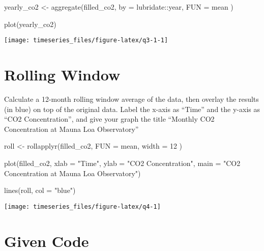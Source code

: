 \documentclass[
]{book}
\newenvironment{Shaded}{\begin{snugshade}}{\end{snugshade}}
\newcommand{\AttributeTok}[1]{\textcolor[rgb]{0.77,0.63,0.00}{#1}}
\newcommand{\DecValTok}[1]{\textcolor[rgb]{0.00,0.00,0.81}{#1}}
\newcommand{\FunctionTok}[1]{\textcolor[rgb]{0.00,0.00,0.00}{#1}}
\newcommand{\NormalTok}[1]{#1}
\newcommand{\OtherTok}[1]{\textcolor[rgb]{0.56,0.35,0.01}{#1}}
\newcommand{\SpecialCharTok}[1]{\textcolor[rgb]{0.00,0.00,0.00}{#1}}
\newcommand{\StringTok}[1]{\textcolor[rgb]{0.31,0.60,0.02}{#1}}
\begin{document}
\begin{Shaded}
\begin{Highlighting}[]
\NormalTok{yearly\_co2 }\OtherTok{\textless{}{-}} \FunctionTok{aggregate}\NormalTok{(filled\_co2,}
  \AttributeTok{by =}\NormalTok{ lubridate}\SpecialCharTok{::}\NormalTok{year,}
  \AttributeTok{FUN =}\NormalTok{ mean}
\NormalTok{)}


\FunctionTok{plot}\NormalTok{(yearly\_co2)}
\end{Highlighting}
\end{Shaded}

\begin{center}\texttt{[image: timeseries\_files/figure-latex/q3-1-1]} \end{center}

\newpage

\hypertarget{rolling-window-1}{%
\section{Rolling Window}\label{rolling-window-1}}

Calculate a 12-month rolling window average of the data, then overlay the results (in blue) on top of the original data. Label the x-axis as ``Time'' and the y-axis as ``CO2 Concentration'', and give your graph the title ``Monthly CO2 Concentration at Mauna Loa Observatory''

\begin{Shaded}
\begin{Highlighting}[]
\NormalTok{roll }\OtherTok{\textless{}{-}} \FunctionTok{rollapplyr}\NormalTok{(filled\_co2,}
  \AttributeTok{FUN =}\NormalTok{ mean,}
  \AttributeTok{width =} \DecValTok{12}
\NormalTok{)}

\FunctionTok{plot}\NormalTok{(filled\_co2,}
     \AttributeTok{xlab =} \StringTok{"Time"}\NormalTok{,}
     \AttributeTok{ylab =} \StringTok{"CO2 Concentration"}\NormalTok{,}
     \AttributeTok{main =} \StringTok{"CO2 Concentration at Mauna Loa Observatory"}\NormalTok{)}

\FunctionTok{lines}\NormalTok{(roll, }\AttributeTok{col =} \StringTok{"blue"}\NormalTok{)}
\end{Highlighting}
\end{Shaded}

\begin{center}\texttt{[image: timeseries\_files/figure-latex/q4-1]} \end{center}

\newpage

\hypertarget{given-code}{%
\section{Given Code}\label{given-code}}
\end{document}
